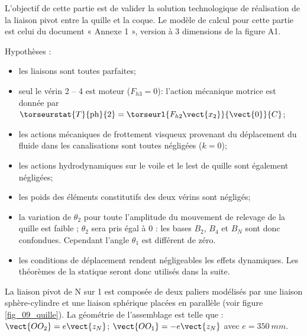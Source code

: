L’objectif de cette partie est de valider la solution technologique de réalisation de la liaison pivot entre la quille et la coque. 
Le modèle de calcul pour cette partie est celui du document « Annexe 1 », version à 3 dimensions de la figure A1.%

Hypothèses :
\begin{itemize}
\item les liaisons sont toutes parfaites;
\item seul le vérin 2 -- 4 est moteur ($F_{h3}=0$): l’action mécanique motrice est donnée par $\torseurstat{T}{\text{ph}}{2} = \torseurl{F_{h2}\vect{x_2}}{\vect{0}}{C}$;
\item les actions mécaniques de frottement visqueux provenant du déplacement du fluide dans les canalisations sont toutes négligées ($k=0$);
\item les actions hydrodynamiques sur le voile et le lest de quille sont également négligées;
\item les poids des éléments constitutifs des deux vérins sont négligés;
\item la variation de $\theta_2$ pour toute l’amplitude du mouvement de relevage de la quille est faible ; $\theta_2$ sera pris égal à 0 : les bases $B_2$,  $B_4$ et $B_N$ sont donc confondues. Cependant l’angle $\theta_1$ est différent de zéro.
\item les conditions de déplacement rendent négligeables les effets dynamiques. Les théorèmes de la statique seront donc utilisés dans la suite.
\end{itemize}





La liaison pivot de N sur 1 est composée de deux paliers modélisés par une liaison sphère-cylindre et une liaison sphérique placées en parallèle (voir figure \ref{fig_09_quille}). La géométrie de l’assemblage est telle que : $\vect{OO_2}=e\vect{z_N}$; $\vect{OO_1}=-e\vect{z_N}$ avec $e=\SI{350}{mm}$.

